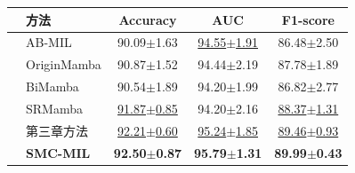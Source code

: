 \begin{table}[h!]
  \large    %
  \centering
  \begin{tabularx}{\textwidth}{clCCC}
    \toprule
    &方法  & Accuracy& AUC&F1-score\\ \midrule
    &AB-MIL  & 90.09$\pm$1.63 & \underline{94.55$\pm$1.91} & 86.48$\pm$2.50\\
    &OriginMamba        & 90.87$\pm$1.52 & 94.44$\pm$2.19 & 87.78$\pm$1.89\\
    &BiMamba          & 90.54$\pm$1.89 & 94.20$\pm$1.99 & 86.82$\pm$2.77\\
    &SRMamba & \underline{91.87$\pm$0.85} & 94.20$\pm$2.16 & \underline{88.37$\pm$1.31}\\
    &%
    第三章方法 & \underline{92.21$\pm$0.60} & \underline{95.24$\pm$1.85} & \underline{89.46$\pm$0.93}\\  
    &\textbf{SMC-MIL}        & \textbf{92.50$\pm$0.87} & \textbf{95.79$\pm$1.31} & \textbf{89.99$\pm$0.43}\\  
    \bottomrule
  \end{tabularx}
 \vspace{-25pt}
  \label{table4: CAMELYON_PLIP}
\end{table}
